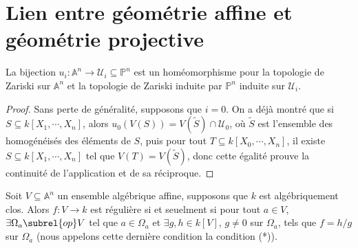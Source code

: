     \section{Lien entre géométrie affine et géométrie projective}
        \begin{lemm}
            La bijection $u_i : \mathbb{A}^n \to \mathcal{U}_i \subseteq \mathbb{P}^n$ est un homéomorphisme pour la topologie de Zariski sur $\mathbb{A}^n$ et la topologie de Zariski induite par $\mathbb{P}^n$ induite sur $\mathcal{U}_i$.
        \end{lemm}
        \begin{proof}
            Sans perte de généralité, supposons que $i = 0$. On a déjà montré que si $S \subseteq k[X_1, \cdots, X_n]$, alors $u_0(V(S)) = V(\tilde S) \cap \mathcal{U}_0$, où $\tilde S$ est l'ensemble des homogénéisés des éléments de $S$, puis pour tout $T \subseteq k[X_0, \cdots, X_n]$, il existe $S \subseteq k[X_1, \cdots, X_n]$ tel que $V(T) = V(\tilde S)$, donc cette égalité prouve la continuité de l'application et de sa réciproque.
        \end{proof}
        \begin{prop}
            Soit $V \subseteq \mathbb{A}^n$ un ensemble algébrique affine, supposons que $k$ est algébriquement clos. Alors $f : V \to k$ est régulière si et seuelment si pour tout $a \in V$, $\exists \Omega_a \subrel{op} V$ tel que $a \in \Omega_a$ et $\exists g,h \in k[V]$, $g \neq 0$ sur $\Omega_a$, tels que $f = h/g$ sur $\Omega_a$ (nous appelons cette dernière condition la condition (*)).
        \end{prop}
